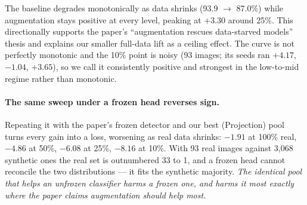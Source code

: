 \documentclass[11pt]{article}
\begin{document}
\begin{table}[htbp]
\centering
\caption{\textbf{Data-Scarcity Sweep Results ($uf=2$).} Classification accuracy across different real training set fractions with a fixed synthetic pool (evaluated over 3 seeds).}
\label{tab:scarcity_results}
\end{table}

The baseline degrades monotonically as data shrinks (93.9 $\to$ 87.0\%) while augmentation stays positive at every level, peaking at $+3.30$ around 25\%. This directionally supports the paper's ``augmentation rescues data-starved models'' thesis and explains our smaller full-data lift as a ceiling effect. The curve is not perfectly monotonic and the 10\% point is noisy (93 images; its seeds ran $+4.17$, $-1.04$, $+3.65$), so we call it consistently positive and strongest in the low-to-mid regime rather than monotonic.

\paragraph{The same sweep under a frozen head reverses sign.} Repeating it with the paper's frozen detector and our best (Projection) pool turns every gain into a loss, worsening as real data shrinks: $-1.91$ at 100\% real, $-4.86$ at 50\%, $-6.08$ at 25\%, $-8.16$ at 10\%. With 93 real images against 3{,}068 synthetic ones the real set is outnumbered 33 to 1, and a frozen head cannot reconcile the two distributions --- it fits the synthetic majority. \emph{The identical pool that helps an unfrozen classifier harms a frozen one, and harms it most exactly where the paper claims augmentation should help most.}
\end{document}
